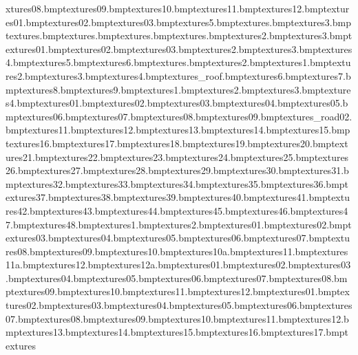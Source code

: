 xtures\safaritemple08.bmp textures\safaritemple09.bmp textures\safaritemple10.bmp textures\safaritemple11.bmp textures\safaritemple12.bmp textures\safaritemplefloor01.bmp textures\safaritemplefloor02.bmp textures\safaritemplefloor03.bmp textures\safe5.bmp textures\safeback.bmp textures\safeside3.bmp textures\safsamface.bmp textures\safwheel.bmp textures\safwheelgrip.bmp textures\sand.bmp textures\sand2.bmp textures\sand3.bmp textures\sandbeach01.bmp textures\sandbeach02.bmp textures\sandbeach03.bmp textures\sandbed2.bmp textures\sandbed3.bmp textures\sandbed4.bmp textures\sandbed5.bmp textures\sandbed6.bmp textures\sandbedrock.bmp textures\sandbedrock2.bmp textures\sandcastle1.bmp textures\sandcastle2.bmp textures\sandcastle3.bmp textures\sandcastle4.bmp textures\tower_roof.bmp textures\sandcastle6.bmp textures\sandcastle7.bmp textures\sandcastle8.bmp textures\sandcastle9.bmp textures\sandedge1.bmp textures\sandedge2.bmp textures\sandedge3.bmp textures\sandedge4.bmp textures\sandrock01.bmp textures\sandrock02.bmp textures\sandrock03.bmp textures\sandrock04.bmp textures\sandrock05.bmp textures\sandrock06.bmp textures\sandrock07.bmp textures\sandrock08.bmp textures\sandrock09.bmp textures\zoo_road02.bmp textures\sandrock11.bmp textures\sandrock12.bmp textures\sandrock13.bmp textures\sandrock14.bmp textures\sandrock15.bmp textures\sandrock16.bmp textures\sandrock17.bmp textures\sandrock18.bmp textures\sandrock19.bmp textures\sandrock20.bmp textures\sandrock21.bmp textures\sandrock22.bmp textures\sandrock23.bmp textures\sandrock24.bmp textures\sandrock25.bmp textures\sandrock26.bmp textures\sandrock27.bmp textures\sandrock28.bmp textures\sandrock29.bmp textures\sandrock30.bmp textures\sandrock31.bmp textures\sandrock32.bmp textures\sandrock33.bmp textures\sandrock34.bmp textures\sandrock35.bmp textures\sandrock36.bmp textures\sandrock37.bmp textures\sandrock38.bmp textures\sandrock39.bmp textures\sandrock40.bmp textures\sandrock41.bmp textures\sandrock42.bmp textures\sandrock43.bmp textures\sandrock44.bmp textures\sandrock45.bmp textures\sandrock46.bmp textures\sandrock47.bmp textures\sandrock48.bmp textures\sandstep1.bmp textures\sandstep2.bmp textures\sdomestrip01.bmp textures\sdomestrip02.bmp textures\sdomestrip03.bmp textures\sdomestrip04.bmp textures\sdomestrip05.bmp textures\sdomestrip06.bmp textures\sdomestrip07.bmp textures\sdomestrip08.bmp textures\sdomestrip09.bmp textures\sdomestrip10.bmp textures\sdomestrip10a.bmp textures\sdomestrip11.bmp textures\sdomestrip11a.bmp textures\sdomestrip12.bmp textures\sdomestrip12a.bmp textures\sdomestripi01.bmp textures\sdomestripi02.bmp textures\sdomestripi03.bmp textures\sdomestripi04.bmp textures\sdomestripi05.bmp textures\sdomestripi06.bmp textures\sdomestripi07.bmp textures\sdomestripi08.bmp textures\sdomestripi09.bmp textures\sdomestripi10.bmp textures\sdomestripi11.bmp textures\sdomestripi12.bmp textures\sharprock01.bmp textures\sharprock02.bmp textures\sharprock03.bmp textures\sharprock04.bmp textures\sharprock05.bmp textures\sharprock06.bmp textures\sharprock07.bmp textures\sharprock08.bmp textures\sharprock09.bmp textures\sharprock10.bmp textures\sharprock11.bmp textures\sharprock12.bmp textures\sharprock13.bmp textures\sharprock14.bmp textures\sharprock15.bmp textures\sharprock16.bmp textures\sharprock17.bmp textures\sharpr